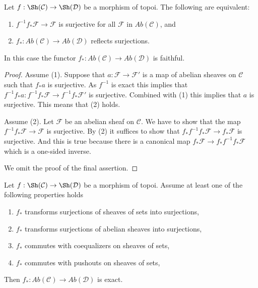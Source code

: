 \begin{lemma}
\label{lemma-reflect-surjections}
Let $f : \Sh(\mathcal{C}) \to \Sh(\mathcal{D})$ be
a morphism of topoi. The following are equivalent:
\begin{enumerate}
\item $f^{-1}f_*\mathcal{F} \to \mathcal{F}$ is surjective for
all $\mathcal{F}$ in $\textit{Ab}(\mathcal{C})$, and
\item $f_* : \textit{Ab}(\mathcal{C}) \to \textit{Ab}(\mathcal{D})$
reflects surjections.
\end{enumerate}
In this case the functor
$f_* : \textit{Ab}(\mathcal{C}) \to \textit{Ab}(\mathcal{D})$
is faithful.
\end{lemma}

\begin{proof}
Assume (1). Suppose that $a : \mathcal{F} \to \mathcal{F}'$
is a map of abelian sheaves on $\mathcal{C}$ such that $f_*a$ is surjective.
As $f^{-1}$ is exact this implies that
$f^{-1}f_*a : f^{-1}f_*\mathcal{F} \to f^{-1}f_*\mathcal{F}'$
is surjective. Combined with (1) this implies that $a$ is surjective.
This means that (2) holds.

\medskip\noindent
Assume (2). Let $\mathcal{F}$ be an abelian sheaf on $\mathcal{C}$.
We have to show that the map $f^{-1}f_*\mathcal{F} \to \mathcal{F}$ is
surjective. By (2) it suffices to show that
$f_*f^{-1}f_*\mathcal{F} \to f_*\mathcal{F}$ is surjective.
And this is true because there is a canonical map
$f_*\mathcal{F} \to f_*f^{-1}f_*\mathcal{F}$ which is a one-sided inverse.

\medskip\noindent
We omit the proof of the final assertion.
\end{proof}

\begin{lemma}
\label{lemma-exactness}
Let $f : \Sh(\mathcal{C}) \to \Sh(\mathcal{D})$ be
a morphism of topoi. Assume at least one of the following properties
holds
\begin{enumerate}
\item $f_*$ transforms surjections of sheaves of sets into surjections,
\item $f_*$ transforms surjections of abelian sheaves into surjections,
\item $f_*$ commutes with coequalizers on sheaves of sets,
\item $f_*$ commutes with pushouts on sheaves of sets,
\end{enumerate}
Then $f_* : \textit{Ab}(\mathcal{C}) \to \textit{Ab}(\mathcal{D})$
is exact.
\end{lemma}

